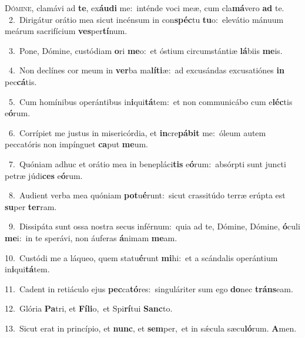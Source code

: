 \lettrine{\initial\textcolor{\initialcolor}{D}}{ómine,} clamávi ad \textbf{te}\-, ex\-\textbf{áu}\-\textbf{di} me:~\star inténde voci meæ, cum cla\-\textbf{má}\-vero \textbf{ad} te.\\
{\numbfont\textcolor{\numbcolor}{~2.}}~Dirigátur orátio mea sicut incénsum in con\-\textbf{spéc}\-tu \textbf{tu}\-o:~\star elevátio mánuum meárum sacrifícium \textbf{ves}\-per\-\textbf{tí}\-num.\par
{\numbfont\textcolor{\numbcolor}{~3.}}~Pone, Dómine, custódiam \textbf{o}\-ri \textbf{me}\-o:~\star et óstium circumstántiæ \textbf{lá}\-biis \textbf{me}\-is.\par
{\numbfont\textcolor{\numbcolor}{~4.}}~Non declínes cor meum in \textbf{ver}\-ba ma\-\textbf{lí}\-\textbf{ti}æ:~\star ad excusándas excusatiónes \textbf{in} pec\-\textbf{cá}\-tis.\par
{\numbfont\textcolor{\numbcolor}{~5.}}~Cum homínibus operántibus in\-\textbf{i}\-qui\-\textbf{tá}\-tem:~\star et non communicábo cum e\-\textbf{léc}\-tis e\-\textbf{ó}\-rum.\par
{\numbfont\textcolor{\numbcolor}{~6.}}~Corrípiet me justus in misericórdia, et \textbf{in}\-cre\-\textbf{pá}\-\textbf{bit} me:~\star óleum autem peccatóris non impínguet \textbf{ca}\-put \textbf{me}\-um.\par
{\numbfont\textcolor{\numbcolor}{~7.}}~Quóniam adhuc et orátio mea in benepláci\textbf{tis} e\-\textbf{ó}\-rum:~\star absórpti sunt juncti petræ júdi\textbf{ces} e\-\textbf{ó}\-rum.\par
{\numbfont\textcolor{\numbcolor}{~8.}}~Audient verba mea quóniam \textbf{pot}\-u\-\textbf{é}\-runt:~\star sicut crassitúdo terræ erúpta est \textbf{su}\-per \textbf{ter}\-ram.\par
{\numbfont\textcolor{\numbcolor}{~9.}}~Dissipáta sunt ossa nostra secus inférnum:~\dagger quia ad te, Dómine, Dómine, \textbf{ó}\-culi \textbf{me}\-i:~\star in te sperávi, non áuferas \textbf{á}\-nimam \textbf{me}\-am.\par
{\numbfont\textcolor{\numbcolor}{10.}}~Custódi me a láqueo, quem statu\-\textbf{é}\-runt \textbf{mi}\-hi:~\star et a scándalis operántium in\-\textbf{i}\-qui\-\textbf{tá}\-tem.\par
{\numbfont\textcolor{\numbcolor}{11.}}~Cadent in retiáculo ejus \textbf{pec}\-ca\-\textbf{tó}\-res:~\star singuláriter sum ego \textbf{do}\-nec \textbf{tráns}\-eam.\par
{\numbfont\textcolor{\numbcolor}{12.}}~Glória \textbf{Pa}\-tri, et \textbf{Fí}\-\textbf{li}o,~\star et Spi\-\textbf{rí}\-tui \textbf{Sanc}\-to.\par
{\numbfont\textcolor{\numbcolor}{13.}}~Sicut erat in princípio, et \textbf{nunc}\-, et \textbf{sem}\-per,~\star et in sǽcula sæcu\-\textbf{ló}\-rum. \textbf{A}\-men.\par
